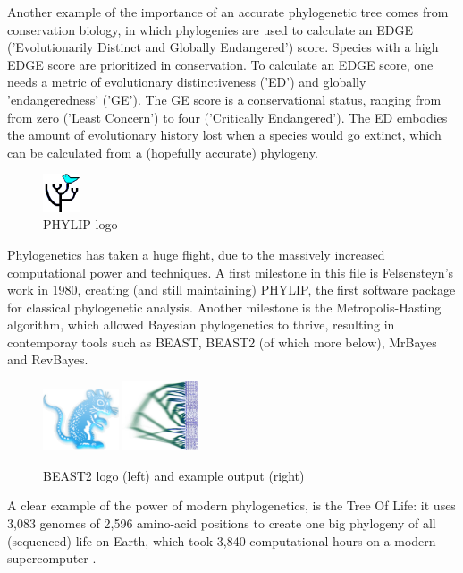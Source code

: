 Another example of the importance of an accurate phylogenetic tree 
comes from conservation biology, in which phylogenies are used to
calculate an EDGE ('Evolutionarily Distinct and Globally Endangered') 
score. Species with a high EDGE score are prioritized in conservation.
To calculate an EDGE score, one needs a metric of evolutionary 
distinctiveness ('ED') and globally 'endangeredness' ('GE').
The GE score is a conservational status, ranging from from zero ('Least Concern') 
to four ('Critically Endangered'). 
The ED embodies the amount of evolutionary history lost when a species 
would go extinct, which can be calculated from a (hopefully accurate) 
phylogeny.

\begin{figure}[H]
  \includegraphics[width=0.1\textwidth]{phylip.png}
  \caption{
    PHYLIP logo
 }
  \label{fig:phylip}
\end{figure}

Phylogenetics has taken a huge flight, due to the massively increased
computational power and techniques. A first milestone in this file is 
Felsensteyn's work in 1980, creating (and still maintaining) PHYLIP, 
the first software package for classical phylogenetic analysis.
Another milestone is the Metropolis-Hasting algorithm, which 
allowed Bayesian phylogenetics to thrive, resulting in
contemporay tools such as BEAST, BEAST2 (of which more below), 
MrBayes and RevBayes.

\begin{figure}[H]
  \includegraphics[width=0.2\textwidth]{beast_logo.png}
  \includegraphics[width=0.2\textwidth]{DensiTreeExample2.jpg}
  \caption{
    BEAST2 logo (left) and example output (right)
 }
  \label{fig:beast2}
\end{figure}

A clear example of the power of modern phylogenetics,
is the Tree Of Life: it uses 
3,083 genomes of 2,596 amino-acid positions 
to create one big phylogeny of all (sequenced) life on Earth,
which took 3,840 computational hours on a modern supercomputer \cite{hug2016new}.


